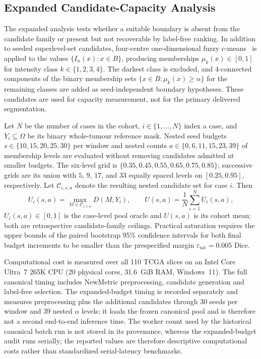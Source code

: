 \documentclass[11pt,a4paper]{article}
\begin{document}
\subsection{Expanded Candidate-Capacity Analysis}\label{sec:saturation-method}

The expanded analysis tests whether a suitable boundary is absent from the
candidate family or present but not recoverable by label-free ranking. In
addition to seeded superlevel-set candidates, four-centre one-dimensional fuzzy
$c$-means~\cite{bezdek1981} is applied to the values $\{I_n(x):x\in B\}$,
producing memberships $\mu_k(x)\in[0,1]$ for intensity class
$k\in\{1,2,3,4\}$. The darkest class is
excluded, and 4-connected components of the binary membership sets
$\{x\in B:\mu_k(x)\ge\alpha\}$ for the remaining classes are added
as seed-independent boundary hypotheses. These candidates are used for capacity
measurement, not for the primary delivered segmentation.

Let $N$ be the number of cases in the cohort, $i\in\{1,\ldots,N\}$ index a
case, and $Y_i\subseteq\Omega$ be its binary whole-tumour reference mask. Nested
seed budgets $s\in\{10,15,20,25,30\}$ per window and nested counts
$a\in\{0,6,11,15,23,39\}$ of membership levels are evaluated without removing
candidates admitted at smaller budgets. The six-level grid is
$\{0.35,0.45,0.55,0.65,0.75,0.85\}$; successive grids are its union with
$5$, $9$, $17$, and $33$ equally spaced levels on $[0.25,0.95]$, respectively.
Let
$\mathcal C_{i,s,a}$ denote the resulting nested candidate set for case $i$.
Then
\begin{equation}
 U_i(s,a)=\max_{M\in\mathcal C_{i,s,a}}D(M,Y_i),\qquad
 U(s,a)=\frac{1}{N}\sum_{i=1}^{N}U_i(s,a),
\label{eq:saturation-ceiling}
\end{equation}
$U_i(s,a)\in[0,1]$ is the case-level pool oracle and $U(s,a)$ is its cohort
mean; both are retrospective candidate-family ceilings. Practical saturation
requires the upper bounds of the
paired bootstrap $95\%$ confidence intervals for both final budget increments to
be smaller than the prespecified margin $\varepsilon_{\mathrm{sat}}=0.005$ Dice.

Computational cost is measured over all 110 TCGA slices on an Intel Core
Ultra~7 265K CPU (20 physical cores, 31.6~GiB RAM, Windows~11). The full canonical timing includes
NewMetric preprocessing, candidate generation and label-free selection. The
expanded-budget timing is recorded separately and measures preprocessing plus
the additional candidates through 30 seeds per window and 39 nested $\alpha$
levels; it loads the frozen canonical pool and is therefore not a second
end-to-end inference time. The worker count used by the historical canonical
batch run is not stored in its provenance, whereas the expanded-budget audit
runs serially; the reported values are therefore descriptive computational
costs rather than standardized serial-latency benchmarks.
\end{document}
